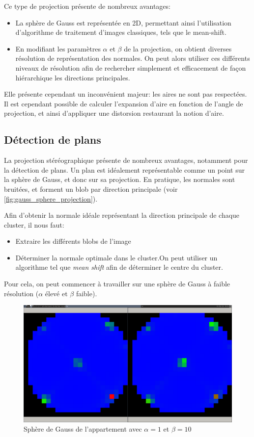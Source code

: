 \documentclass{article}
\begin{document}
Ce type de projection présente de nombreux avantages:
\begin{itemize}
\item La sphère de Gauss est représentée en 2D, permettant ainsi l'utilisation d'algorithme de traitement d'images classiques, tels que le mean-shift.
\item En modifiant les paramètres $\alpha$ et $\beta$ de la projection, on obtient diverses résolution de représentation des normales. On peut alors utiliser ces différents niveaux de résolution afin de rechercher simplement et efficacement de façon hiérarchique les directions principales.
\end{itemize}

Elle présente cependant un inconvénient majeur: les aires ne sont pas respectées. Il est cependant possible de calculer l'expansion d'aire en fonction de l'angle de projection, et ainsi d'appliquer une distorsion restaurant la notion d'aire.

\subsection{Détection de plans}

La projection stéréographique présente de nombreux avantages, notamment pour la détection de plans. Un plan est idéalement représentable comme un point sur la sphère de Gauss, et donc sur sa projection. En pratique, les normales sont bruitées, et forment un blob par direction principale (voir \ref{fig:gauss_sphere_projection}).

Afin d'obtenir la normale idéale représentant la direction principale de chaque cluster, il nous faut:
\begin{itemize}
\item Extraire les différents blobs de l'image
\item Déterminer la normale optimale dans le cluster.On peut utiliser un algorithme tel que \emph{mean shift} afin de déterminer le centre du cluster.
\end{itemize}

Pour cela, on peut commencer à travailler sur une sphère de Gauss à faible résolution ($\alpha$ élevé et $\beta$ faible).

\begin{figure}[H]
\centering
\includegraphics[width=\textwidth]{../2014-02-28-085518_1600x900_scrot.png}
\caption{Sphère de Gauss de l'appartement avec $\alpha=1$ et $\beta=10$}
\label{fig:sphere_gauss_low_res}
\end{figure}
\end{document}
